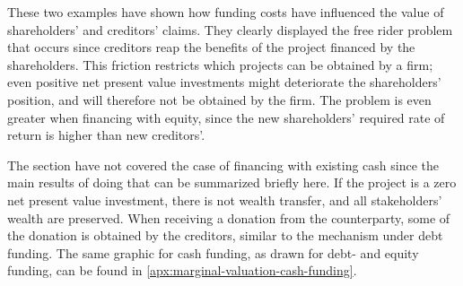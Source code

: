 \documentclass[main.tex]{subfiles}
\begin{document}
    These two examples have shown how funding costs have influenced 
    the value of shareholders' and creditors' claims.
    They clearly displayed the free rider problem that occurs
    since creditors reap the benefits of the project financed by the shareholders.
    This friction restricts which projects can be obtained by a firm;
    even positive net present value investments might deteriorate the shareholders' position,
    and will therefore not be obtained by the firm.
    The problem is even greater when financing with equity, 
    since the new shareholders' required rate of return is higher than new creditors'.
    
    The section have not covered the case of financing with existing cash
    since the main results of doing that can be summarized briefly here.
    If the project is a zero net present value investment, there is not wealth transfer,
    and all stakeholders' wealth are preserved.
    When receiving a donation from the counterparty, 
    some of the donation is obtained by the creditors, similar to the mechanism under debt funding.
    The same graphic for cash funding, as drawn for debt- and equity funding, can be found in 
    \cref{apx:marginal-valuation-cash-funding}.
\end{document}
